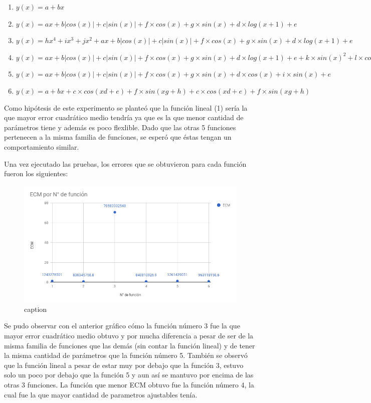 \begin{enumerate}
  \item $y(x) = a + bx$
  \item $y(x) = ax + b|cos(x)| + c|sin(x)| + f  \times  cos(x) + g  \times  sin(x) + d  \times  log(x+1) + e$
  \item $y(x) = hx^4 + ix^3 + jx^2 + ax + b|cos(x)| + c|sin(x)| + f  \times  cos(x) + g  \times  sin(x) + d  \times  log(x+1) + e$
  \item $y(x) = ax + b|cos(x)| + c|sin(x)| + f  \times  cos(x) + g  \times  sin(x) + d  \times  log(x+1) + e + k  \times  sin(x) ^ 2 + l  \times  cos(x) ^ 2$
  \item $y(x) = ax + b|cos(x)| + c|sin(x)| + f  \times  cos(x) + g  \times  sin(x) + d  \times  cos(x) + i  \times  sin(x)  + e$
  \item $y(x) = a + bx + c  \times  cos(xd + e) + f  \times  sin(xg + h) + c  \times  cos(xd + e) + f  \times  sin(xg + h)$
\end{enumerate}


Como hipótesis de este experimento se planteó que la función lineal (1) sería la que mayor error cuadrático medio tendría ya que es la que menor cantidad de parámetros tiene y además es poco flexlible. Dado que las otras 5 funciones pertenecen a la misma familia de funciones, se esperó que éstas tengan un comportamiento similar.

Una vez ejecutado las pruebas, los errores que se obtuvieron para cada función fueron los siguientes:

\begin{figure}[!htb]
\begin{center}
\includegraphics[scale=0.5]{imagenes/ecm_por_fn.png}
\caption{caption}
\label{label}
\end{center}
\end{figure}

Se pudo observar con el anterior gráfico cómo la función número 3 fue la que mayor error cuadrático medio obtuvo y por mucha diferencia a pesar de ser de la misma familia de funciones que las demás (sin contar la función lineal) y de tener la misma cantidad de parámetros que la función número 5. También se observó que la función lineal a pesar de estar muy por debajo que la función 3, estuvo solo un poco por debajo que la función 5 y aun así se mantuvo por encima de las otras 3 funciones.
La función que menor ECM obtuvo fue la función número 4, la cual fue la que mayor cantidad de parametros ajustables tenía.
